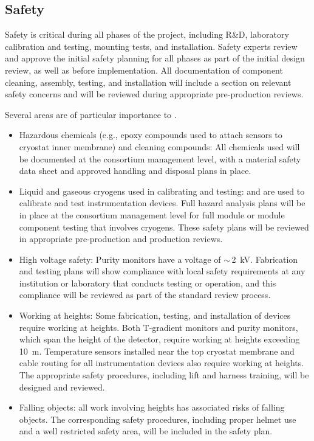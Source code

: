 \subsection{Safety}
Safety %
is critical during %
all phases of the  project, including R\&D, laboratory calibration and testing, mounting tests, and installation. 
Safety experts %
review and approve the initial safety planning for all phases as part of the initial design review, as well as %
before implementation. 
All documentation of component cleaning, assembly, testing, and installation will include a section on relevant safety concerns and will be reviewed during appropriate pre-production reviews.

Several areas are of particular importance to .
\begin{itemize}
\item Hazardous chemicals (e.g., epoxy compounds used to attach sensors to cryostat inner membrane) and cleaning compounds:
  All chemicals used will be documented at the consortium management level, with a material safety data sheet
  and approved handling and disposal plans in place.

\item Liquid and gaseous cryogens used in calibrating and testing:  and  %
are used to calibrate and test instrumentation devices.
  Full hazard analysis plans will be in place at the consortium management level for full module or
  module component testing that involves %
  cryogens. These safety plans will be reviewed in appropriate pre-production and production reviews.

\item High voltage safety:  Purity monitors %
have a voltage of $\sim\,$\SI{2}{kV}. Fabrication and testing plans will show compliance with local
   safety requirements at %
  any institution or laboratory that conducts testing or operation, and this compliance will be reviewed as part of the standard review process.

\item Working at heights: Some fabrication, testing, and installation of  devices require working at heights.
  Both T-gradient monitors and purity monitors, which span the height of the detector, require working at heights exceeding \SI{10}{m}.
  Temperature sensors installed near the top cryostat membrane and cable routing for all instrumentation devices
  also require working at heights. %
  The appropriate safety procedures, including lift and harness training, will be designed and reviewed. 
  
\item Falling objects: all work involving heights has associated risks of falling objects. The corresponding safety procedures, including proper helmet use 
and a well restricted safety area, will be included in the safety plan. 
\end{itemize}
